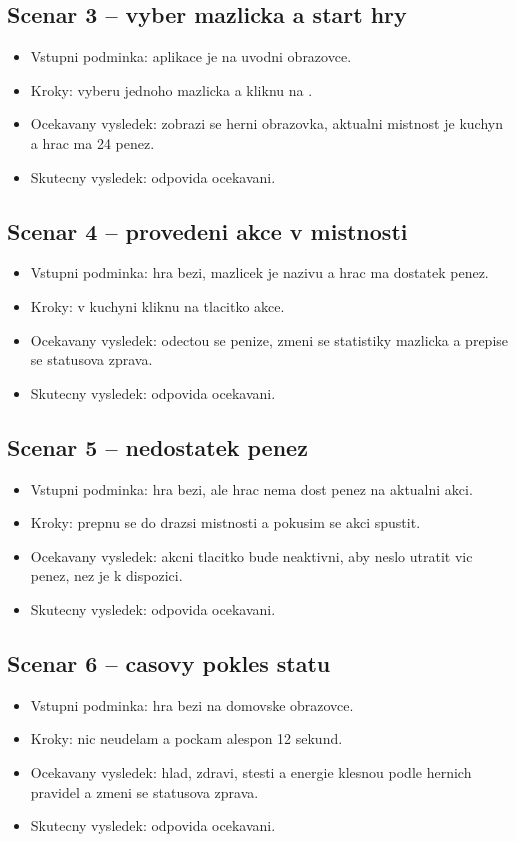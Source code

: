\documentclass[12pt,a4paper]{article}
\begin{document}
\subsection*{Scenar 3 -- vyber mazlicka a start hry}
\begin{itemize}[leftmargin=2em]
  \item Vstupni podminka: aplikace je na uvodni obrazovce.
  \item Kroky: vyberu jednoho mazlicka a kliknu na .
  \item Ocekavany vysledek: zobrazi se herni obrazovka, aktualni mistnost je kuchyn a hrac ma 24 penez.
  \item Skutecny vysledek: odpovida ocekavani.
\end{itemize}

\subsection*{Scenar 4 -- provedeni akce v mistnosti}
\begin{itemize}[leftmargin=2em]
  \item Vstupni podminka: hra bezi, mazlicek je nazivu a hrac ma dostatek penez.
  \item Kroky: v kuchyni kliknu na tlacitko akce.
  \item Ocekavany vysledek: odectou se penize, zmeni se statistiky mazlicka a prepise se statusova zprava.
  \item Skutecny vysledek: odpovida ocekavani.
\end{itemize}

\subsection*{Scenar 5 -- nedostatek penez}
\begin{itemize}[leftmargin=2em]
  \item Vstupni podminka: hra bezi, ale hrac nema dost penez na aktualni akci.
  \item Kroky: prepnu se do drazsi mistnosti a pokusim se akci spustit.
  \item Ocekavany vysledek: akcni tlacitko bude neaktivni, aby neslo utratit vic penez, nez je k dispozici.
  \item Skutecny vysledek: odpovida ocekavani.
\end{itemize}

\subsection*{Scenar 6 -- casovy pokles statu}
\begin{itemize}[leftmargin=2em]
  \item Vstupni podminka: hra bezi na domovske obrazovce.
  \item Kroky: nic neudelam a pockam alespon 12 sekund.
  \item Ocekavany vysledek: hlad, zdravi, stesti a energie klesnou podle hernich pravidel a zmeni se statusova zprava.
  \item Skutecny vysledek: odpovida ocekavani.
\end{itemize}
\end{document}
